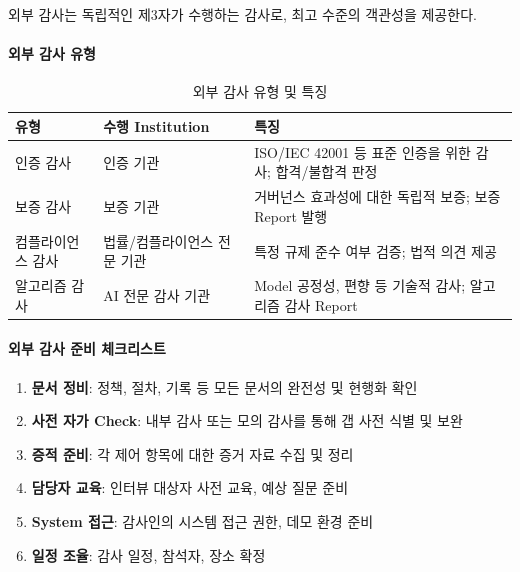 외부 감사는 독립적인 제3자가 수행하는 감사로, 
최고 수준의 객관성을 제공한다.

\paragraph{외부 감사 유형}

\begin{table}[htbp]
\centering
\caption{외부 감사 유형 및 특징}
\label{tab:external_audit_types}
\begin{tabularx}{\textwidth}{p{3cm}p{3cm}X}
\toprule
\textbf{유형} & \textbf{수행 Institution} & \textbf{특징} \\
\midrule
인증 감사 & 
인증 기관 & 
ISO/IEC 42001 등 표준 인증을 위한 감사; 
합격/불합격 판정 \\
\midrule
보증 감사 & 
보증 기관 & 
거버넌스 효과성에 대한 독립적 보증; 
보증 Report 발행 \\
\midrule
컴플라이언스 감사 & 
법률/컴플라이언스 전문 기관 & 
특정 규제 준수 여부 검증; 
법적 의견 제공 \\
\midrule
알고리즘 감사\cite{saleiro2018aequitas}\cite{metaxa2021auditing} & 
AI 전문 감사 기관 & 
Model 공정성, 편향 등 기술적 감사; 
알고리즘 감사 Report \\
\bottomrule
\end{tabularx}
\end{table}


\paragraph{외부 감사 준비 체크리스트}

\begin{enumerate}
 \item \textbf{문서 정비}: 
 정책, 절차, 기록 등 모든 문서의 완전성 및 현행화 확인
 
 \item \textbf{사전 자가 Check}: 
 내부 감사 또는 모의 감사를 통해 갭 사전 식별 및 보완
 
 \item \textbf{증적 준비}: 
 각 제어 항목에 대한 증거 자료 수집 및 정리
 
 \item \textbf{담당자 교육}: 
 인터뷰 대상자 사전 교육, 예상 질문 준비
 
 \item \textbf{System 접근}: 
 감사인의 시스템 접근 권한, 데모 환경 준비
 
 \item \textbf{일정 조율}: 
 감사 일정, 참석자, 장소 확정
\end{enumerate}


